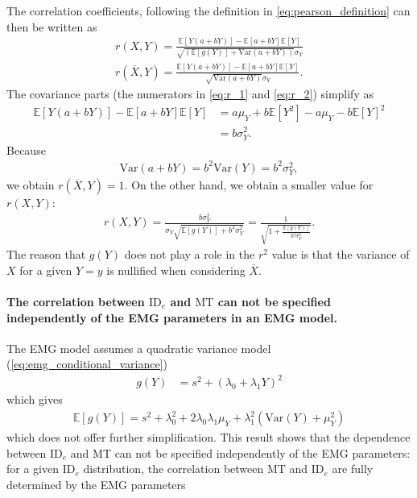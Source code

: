 \documentclass[acmlarge, manuscript,review]{acmart}
\newcommand{\mt}{\ensuremath{{\text{MT}}}\xspace}
\newcommand{\ide}{\ensuremath{{\text{ID}_e}}\xspace}
\begin{document}
The correlation coefficients, following the definition in \autoref{eq:pearson_definition} can then be written as
\begin{align}
	r(X,Y)  = \frac{\mathbb{E}[Y(a + bY)] - \mathbb{E}[a + bY]\mathbb{E}[Y] }{\sqrt{(\mathbb{E}[g(Y)] + \text{Var}(a + bY))}\sigma_Y} \label{eq:r_1} \\
	r(\overline{X}, Y) = \frac{\mathbb{E}[Y(a + bY)] - \mathbb{E}[a + bY]\mathbb{E}[Y] }{\sqrt{\text{Var}(a + bY)}\sigma_Y}. \label{eq:r_2}
\end{align}
The covariance parts (\ie the numerators in \autoref{eq:r_1} and \autoref{eq:r_2}) simplify as
\begin{align}
	\mathbb{E}[Y(a + bY)] - \mathbb{E}[a + bY]\mathbb{E}[Y] & = a \mu_Y + b\mathbb{E}[Y^2] - a\mu_Y - b\mathbb{E}[Y]^2 \\
	                                                        & = b\sigma_Y^2.
\end{align}
Because
\begin{align}
	\text{Var}(a + bY) = b^2\text{Var}(Y) = b^2\sigma_Y^2,
\end{align}
we obtain $r(\overline{X}, Y) = 1$. On the other hand, we obtain a smaller value for $r(X,Y)$:
\begin{align}
	r(X,Y) = \frac{b\sigma_Y^2}{\sigma_Y\sqrt{\mathbb{E}[g(Y)] + b^2\sigma_Y^2}} = \frac{1}{\sqrt{1 + \frac{\mathbb{E}[g(Y)]}{b^2\sigma_Y^2}}}.
\end{align}
The reason that $g(Y)$ does not play a role in the $r^2$ value is that the variance of $X$ for a given $Y=y$ is nullified when considering $\overline{X}$. 

\paragraph{The correlation between \ide and \mt can not be specified independently of the EMG parameters in an EMG model.}
The EMG model assumes a quadratic variance model (\autoref{eq:emg_conditional_variance})
\begin{align}
	g(Y) & = s^2 + (\lambda_0  + \lambda_1 Y)^2
\end{align}
which gives
\begin{align}
	\mathbb{E}[g(Y)] = s^2 + \lambda_0^2 + 2\lambda_0\lambda_1\mu_Y + \lambda_1^2(\text{Var}(Y) + \mu_Y^2)
\end{align}
which does not offer further simplification. This result shows that the dependence between \ide and MT can not be specified independently of the EMG parameters: for a given \ide distribution, the correlation between \mt and \ide are fully determined by the EMG parameters
\end{document}
